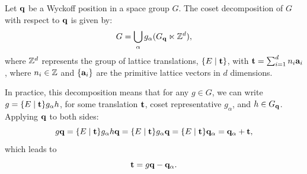 \documentclass[12pt]{report}
\begin{document}

\begin{lemma} \label{lemma:cosetdecomp_wyckoff}
Let \( {\vb{q}} \) be a Wyckoff position in a space group \( G \). The coset decomposition of \( G \) with respect to \( {\vb{q}} \) is given by:
\begin{equation} \label{eq:coset_decomp_wyckoff}
G = \bigcup_\alpha g_\alpha (G_{{\vb{q}}} \ltimes {\mathbb{Z}}^d),
\end{equation}
where \( {\mathbb{Z}}^d \) represents the group of lattice translations, \(\{E\mid {\vb{t}}\}\), with \({\vb{t}} = \sum_{i=1}^d n_i {\vb{a}}_i\), where \( n_i \in {\mathbb{Z}} \) and \(\{{\vb{a}}_i\}\) are the primitive lattice vectors in \( d \) dimensions.

In practice, this decomposition means that for any \( g \in G \), we can write \( g = \{E \mid {\vb{t}}\} g_\alpha h \), for some translation \({\vb{t}}\), coset representative \( g_\alpha \), and \( h \in G_{\vb{q}} \). Applying \( {\vb{q}} \) to both sides:
\begin{equation} \label{eq:coset_decomp_translation_t_step1}
g {\vb{q}} = \{E \mid {\vb{t}}\} g_\alpha h {\vb{q}} = \{E \mid {\vb{t}}\} g_\alpha {\vb{q}} = \{E \mid {\vb{t}}\} {\vb{q}}_\alpha = {\vb{q}}_\alpha + {\vb{t}},
\end{equation}
which leads to
\begin{equation} \label{eq:coset_decomp_translation_t}
{\vb{t}} = g {\vb{q}} - {\vb{q}}_\alpha.
\end{equation}
\end{lemma}
\end{document}
